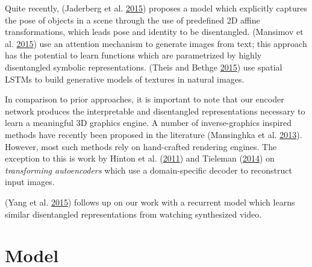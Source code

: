 \documentclass[12pt,twoside]{mitthesis}
\begin{document}
Quite recently, (Jaderberg et al.
\protect\hyperlink{ref-jaderberg2015spatial}{2015}) proposes a model
which explicitly captures the pose of objects in a scene through the use
of predefined 2D affine transformations, which leads pose and identity
to be disentangled. (Mansimov et al.
\protect\hyperlink{ref-mansimov2015generating}{2015}) use an attention
mechanism to generate images from text; this approach has the potential
to learn functions which are parametrized by highly disentangled
symbolic representations. (Theis and Bethge
\protect\hyperlink{ref-theis2015generative}{2015}) use spatial LSTMs to
build generative models of textures in natural images.

In comparison to prior approaches, it is important to note that our
encoder network produces the interpretable and disentangled
representations necessary to learn a meaningful 3D graphics engine. A
number of inverse-graphics inspired methods have recently been proposed
in the literature (Mansinghka et al.
\protect\hyperlink{ref-mansinghka2013approximate}{2013}). However, most
such methods rely on hand-crafted rendering engines. The exception to
this is work by Hinton et al.
(\protect\hyperlink{ref-hinton2011transforming}{2011}) and Tieleman
(\protect\hyperlink{ref-tieleman2014optimizing}{2014}) on
\emph{transforming autoencoders} which use a domain-specific decoder to
reconstruct input images.

(Yang et al. \protect\hyperlink{ref-yang2015weakly}{2015}) follows up on
our work with a recurrent model which learns similar disentangled
representations from watching synthesized video.

\section{Model}\label{model}
\end{document}
